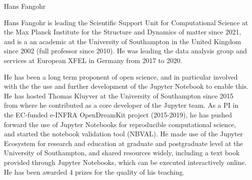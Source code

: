 \begin{participant}[type=leadPI,PM=5,gender=male]{Hans Fangohr}







  \medskip Hans Fangohr is leading the Scientific Support Unit for Computational
  Science at the Max Planck Institute for the Structure and Dynamics of matter
  since 2021, and is a an academic at the University of Southampton in the United Kingdom
  since 2002 (full professor since 2010). He was leading the data analysis group
  and services at European XFEL in Germany from 2017 to 2020.

  He has been a long term proponent of open science, and in particular involved
  with the the use and further development of the Jupyter Notebook to enable
  this. He has hosted Thomas Kluyver at the University of Southampton since 2015
  from where he contributed as a core developer of the Jupyter team. As a PI in
  the EC-funded e-INFRA OpenDreamKit project (2015-2019), he has pushed forward
  the use of Jupyter Notebooks for reproducible computational science, and
  started the notebook validation tool (NBVAL). He made use of the Jupyter
  Ecosystem for research and education at graduate and postgraduate level at the
  University of Southampton, and shared resources widely, including a text book
  provided through Jupyter Notebooks, which can be executed interactively
  online. He has been awarded 4 prizes for the quality of his teaching.


\end{participant}
